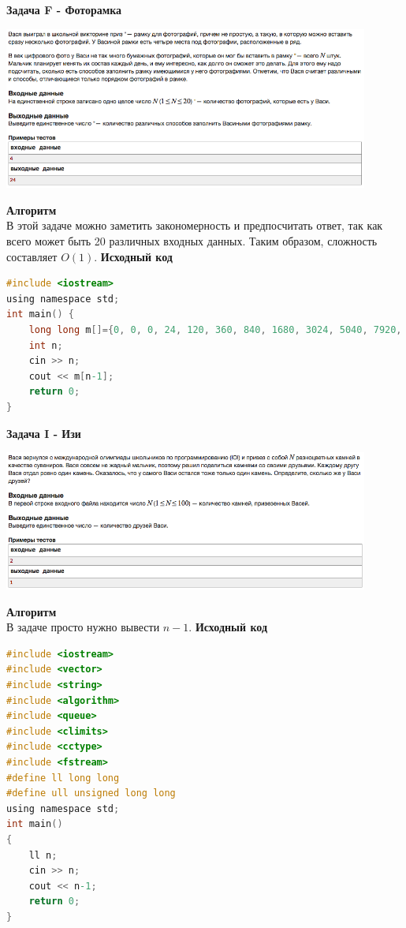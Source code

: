 \documentclass[a4paper,12pt]{article}
\begin{document}
\newpage
\textbf{{\large Задача F - Фоторамка}} \\
\begin{center}
\includegraphics[width=0.9\textwidth]{CT_school_nn/CT_school_nn_F.png}\\ [1cm]
\end{center}
\textbf{{\large Алгоритм}} \\
В этой задаче можно заметить закономерность и предпосчитать ответ, так как всего может быть 20 различных входных данных. Таким образом, сложность составляет $O(1)$.
\newpage
\textbf{{\large Исходный код}} \\
\begin{lstlisting}[language=C]
#include <iostream>
using namespace std;
int main() {
    long long m[]={0, 0, 0, 24, 120, 360, 840, 1680, 3024, 5040, 7920, 11880, 17160, 24024, 32760, 43680, 57120, 73440, 93024, 116280};
    int n;
    cin >> n;
    cout << m[n-1];
    return 0;
}
\end{lstlisting}

\newpage
\textbf{{\large Задача I - Изи}} \\
\begin{center}
\includegraphics[width=0.9\textwidth]{CT_school_nn/CT_school_nn_I.png}\\ [1cm]
\end{center}
\textbf{{\large Алгоритм}} \\
В задаче просто нужно вывести $n - 1$.
\newpage
\textbf{{\large Исходный код}} \\
\begin{lstlisting}[language=C]
#include <iostream>
#include <vector>
#include <string>
#include <algorithm>
#include <queue>
#include <climits>
#include <cctype>
#include <fstream>
#define ll long long
#define ull unsigned long long
using namespace std;
int main()
{
    ll n;
    cin >> n;
    cout << n-1;
    return 0;
}
\end{lstlisting}
\end{document}
